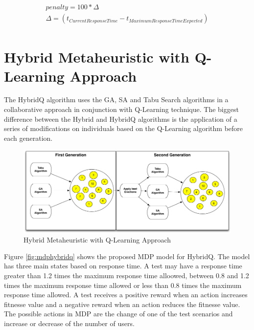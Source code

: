 \begin{equation}
\begin{aligned}
penalty=100 * \Delta \\
\Delta=(t_{Current Response Time} - t_{Maximum Response Time Expected})\\
\end{aligned}
\end{equation}

\section{Hybrid Metaheuristic with Q-Learning Approach}

The HybridQ algorithm uses the GA, SA and Tabu Search algorithms in a collaborative approach in conjunction with Q-Learning technique. The biggest difference between the Hybrid and HybridQ algorithms is the application of a series of modifications on individuals based on the Q-Learning algorithm before each generation.

\begin{figure}[h!]
\center
\includegraphics[width=1\textwidth]{./images/qhybrid.png}
\caption{Hybrid Metaheuristic with Q-Learning Approach}
\label{fig:hybridq}
\end{figure}

Figure \ref{fig:mdphybridq} shows the proposed MDP model for HybridQ. The model has three main states based on response time. A test may have a response time greater than 1.2 times the maximum response time alloowed, between 0.8 and 1.2 times the maximum response time allowed or less than 0.8 times the maximum response time allowed. A test receives a positive reward when an action increases fitnesse value and a negative reward when an action reduces the fitnesse value. The possible actions in MDP are the change of one of the test scenarios and increase or decrease of the number of users.

